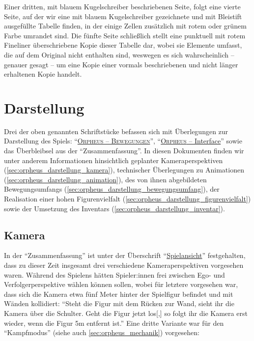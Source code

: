 \documentclass[a5paper,pagesize,numbers=noenddot]{scrbook}
\begin{document}
Einer dritten, mit blauem Kugelschreiber beschriebenen Seite, folgt eine vierte Seite, auf der wir eine mit blauem Kugelschreiber gezeichnete und mit Bleistift ausgefüllte Tabelle finden, in der einige Zellen zusätzlich mit rotem oder grünem Farbe umrandet sind.
Die fünfte Seite schließlich stellt eine punktuell mit rotem Fineliner überschriebene Kopie dieser Tabelle dar, wobei sie Elemente umfasst, die auf dem Original nicht enthalten sind, weswegen es sich wahrscheinlich -- genauer gesagt -- um eine Kopie einer vormals beschriebenen und nicht länger erhaltenen Kopie handelt.


\section{Darstellung}\label{sec:orpheus_darstellung}
Drei der oben genannten Schriftstücke befassen sich mit Überlegungen zur Darstellung des Spiels:
\enquote{\uline{\textsc{Orpheus -- Bewegungen}}}, \enquote{\uline{\textsc{Orpheus} -- Interface}} sowie das Überbleibsel aus der \enquote{Zusammenfassung}.
In diesen Dokumenten finden wir unter anderem Informationen hinsichtlich geplanter Kameraperspektiven (\autoref{sec:orpheus_darstellung_kamera}), technischer Überlegungen zu Animationen (\autoref{sec:orpheus_darstellung_animation}), des von ihnen abgebildeten Bewegungsumfangs (\autoref{sec:orpheus_darstellung_bewegungsumfang}), der Realisation einer hohen Figurenvielfalt (\autoref{sec:orpheus_darstellung_figurenvielfalt}) sowie der Umsetzung des Inventars (\autoref{sec:orpheus_darstellung_inventar}).


\subsection{Kamera}\label{sec:orpheus_darstellung_kamera}
In der \enquote{Zusammenfassung} ist unter der Überschrift \enquote{\uline{Spielansicht}} festgehalten, dass zu dieser Zeit insgesamt drei verschiedene Kameraperspektiven vorgesehen waren.
Während des Spielens hätten Spieler:innen frei zwischen Ego- und Verfolgerperspektive wählen können sollen, wobei für letztere vorgesehen war, dass sich die Kamera etwa fünf Meter hinter der Spielfigur befindet und mit Wänden kollidiert:
\enquote{Steht die Figur mit dem Rücken zur Wand, sieht ihr die Kamera über die Schulter. Geht die Figur jetzt los[,] so folgt ihr die Kamera erst wieder, wenn die Figur 5m entfernt ist.}
Eine dritte Variante war für den \enquote{Kampfmodus} (siehe auch \autoref{sec:orpheus_mechanik}) vorgesehen:
\end{document}
